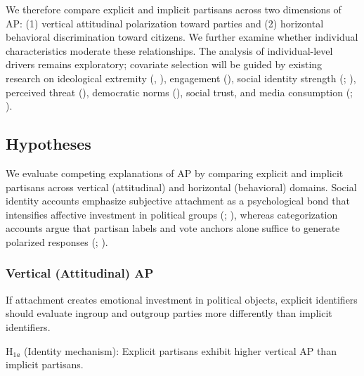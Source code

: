 \documentclass[
  12pt,
  a4paper,
  DIV=11,
  numbers=noendperiod]{scrartcl}
\begin{document}
We therefore compare explicit and implicit partisans across two
dimensions of AP: (1) vertical attitudinal polarization toward parties
and (2) horizontal behavioral discrimination toward citizens. We further
examine whether individual characteristics moderate these relationships.
The analysis of individual-level drivers remains exploratory; covariate
selection will be guided by existing research on ideological extremity
(,
), engagement
(), social
identity strength (;
), perceived threat
(), democratic norms (), social trust, and media consumption
(;
).

\subsection{Hypotheses}\label{sec-hypotheses}

We evaluate competing explanations of AP by comparing explicit and
implicit partisans across vertical (attitudinal) and horizontal
(behavioral) domains. Social identity accounts emphasize subjective
attachment as a psychological bond that intensifies affective investment
in political groups (; ), whereas categorization accounts argue that partisan labels and
vote anchors alone suffice to generate polarized responses
(;
).

\subsubsection{Vertical (Attitudinal) AP}\label{vertical-attitudinal-ap}

If attachment creates emotional investment in political objects,
explicit identifiers should evaluate ingroup and outgroup parties more
differently than implicit identifiers.

\(\text{H}_{1a}\) (Identity mechanism): Explicit partisans exhibit
higher vertical AP than implicit partisans.
\end{document}
